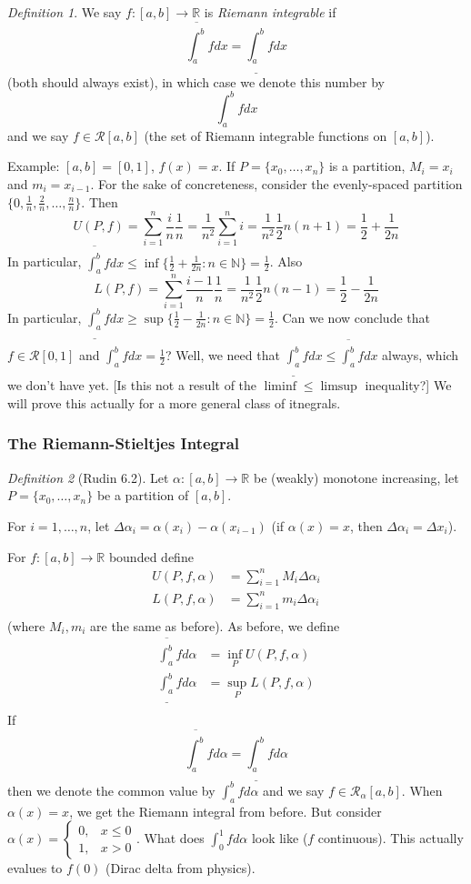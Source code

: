 \documentclass{article}
\theoremstyle{plain}
\theoremstyle{remark}
\newtheorem{definition}{Definition}
\newcommand{\N}{{\mathbb N}}
\newcommand{\R}{{\mathbb R}}
\begin{document}
\begin{definition}
	We say $f \colon [a,b] \to \R$ is \emph{Riemann integrable}	if
	\[
		\overline{\int_a^b}fdx = \underline{\int_a^b}fdx
	\]
	(both should always exist),
	in which case we denote this number by
	\[
		\int_a^b fdx
	\]
	and we say $f \in \mathcal{R}[a,b]$
	(the set of Riemann integrable functions on $[a,b]$).
\end{definition}
Example: $[a,b] = [0,1]$, $f(x) = x$.
If $P = \{x_0,\dots,x_n\}$ is a partition,
$M_i = x_i$ and $m_i = x_{i-1}$.
For the sake of concreteness, consider the evenly-spaced partition
$\{0, \frac1n, \frac2n, \dots, \frac{n}{n}\}$.
Then
\[
	U(P,f) = \sum_{i=1}^n \frac{i}{n}\frac{1}{n}
	= \frac{1}{n^2}\sum_{i=1}^n i = \frac{1}{n^2}\frac12 n(n+1)
	= \frac12 + \frac{1}{2n}
\]
In particular, $\overline{\int_a^b}fdx
\leq \inf\{\frac12+\frac{1}{2n} \colon n \in \N\} = \frac12$.
Also
\[
	L(P,f) = \sum_{i=1}^n \frac{i-1}{n}\frac{1}{n}
	= \frac{1}{n^2}\frac{1}{2}n(n-1)
	= \frac12 - \frac{1}{2n}
\]
In particular, $\underline{\int_a^b}fdx
\geq \sup\{\frac12-\frac{1}{2n} \colon n \in \N\} = \frac12$.
Can we now conclude that $f \in \mathcal{R}[0,1]$
and $\int_a^b fdx = \frac12$?
Well, we need that $\underline{\int_a^b}fdx \leq \overline{\int_a^b}fdx$
always, which we don't have yet.
[Is this not a result of the $\liminf \leq \limsup$ inequality?]
We will prove this actually for a more general class of itnegrals.

\subsubsection{The Riemann-Stieltjes Integral}
\begin{definition}[Rudin 6.2]
	Let $\alpha \colon [a,b] \to \R$ be (weakly) monotone increasing,
	let $P = \{x_0, \dots, x_n\}$ be a partition of $[a,b]$.
\end{definition}
For $i = 1,\dots, n$, let $\Delta \alpha_i = \alpha(x_i) - \alpha(x_{i-1})$
(if $\alpha(x) = x$, then $\Delta \alpha_i = \Delta x_i$).

For $f \colon [a,b] \to \R$ bounded define
\begin{align*}
	U(P,f,\alpha) &= \sum_{i=1}^n M_i \Delta \alpha_i\\
	L(P,f,\alpha) &= \sum_{i=1}^n m_i \Delta \alpha_i\\
\end{align*}
(where $M_i,m_i$ are the same as before).
As before, we define
\begin{align*}
	\overline{\int_a^b}fd\alpha &= \inf_P U(P,f,\alpha)\\
	\underline{\int_a^b}fd\alpha &= \sup_P L(P,f,\alpha)\\
\end{align*}
If
\[
	\overline{\int_a^b}fd\alpha = \underline{\int_a^b}fd\alpha
\]
then we denote the common value by $\int_a^b fd\alpha$
and we say $f \in \mathcal{R}_\alpha[a,b]$.
When $\alpha(x) = x$, we get the Riemann integral from before.
But consider $\alpha(x) =\begin{cases} 0, & x \leq 0\\ 1, & x > 0\end{cases}$.
What does $\int_0^1 fd\alpha$ look like ($f$ continuous).
This actually evalues to $f(0)$ (Dirac delta from physics).
\end{document}
